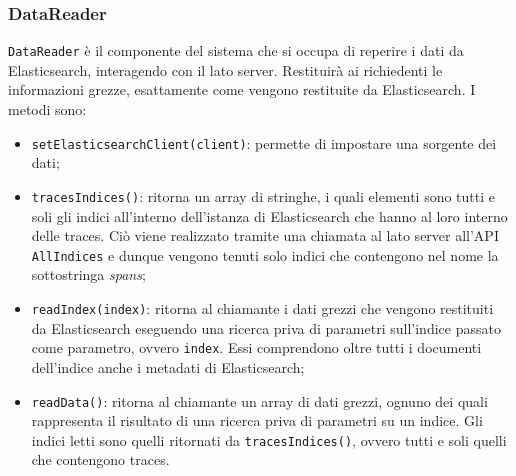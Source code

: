 \subsubsection{DataReader}
\label{sec:DataReader}
\texttt{DataReader} è il componente del sistema che si occupa di reperire i dati da Elasticsearch, interagendo con il lato server. Restituirà ai richiedenti le informazioni grezze, esattamente come vengono restituite da Elasticsearch. I metodi sono:

\begin{itemize}
	\item \texttt{setElasticsearchClient(client)}: permette di impostare una sorgente dei dati;
	\item \texttt{tracesIndices()}: ritorna un array di stringhe, i quali elementi sono tutti e soli gli indici all'interno dell'istanza di Elasticsearch che hanno al loro interno delle traces. Ciò viene realizzato tramite una chiamata al lato server all'API \texttt{AllIndices} e dunque vengono tenuti solo indici che contengono nel nome la sottostringa \emph{spans};
	\item \texttt{readIndex(index)}: ritorna al chiamante i dati grezzi che vengono restituiti da Elasticsearch eseguendo una ricerca priva di parametri sull'indice passato come parametro, ovvero \texttt{index}. Essi comprendono oltre tutti i documenti dell'indice anche i metadati di Elasticsearch;
	\item \texttt{readData()}: ritorna al chiamante un array di dati grezzi, ognuno dei quali rappresenta il risultato di una ricerca priva di parametri su un indice. Gli indici letti sono quelli ritornati da \texttt{tracesIndices()}, ovvero tutti e soli quelli che contengono traces.


\end{itemize}



